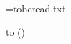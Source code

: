 \newread\recipientfile
\openin\recipientfile=toberead.txt

\loop
\read\recipientfile to\content
(\content)%
\unless\ifeof\recipientfile
\repeat

\closein\recipientfile
\bye